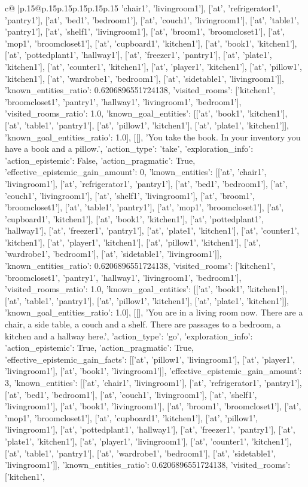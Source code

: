 \documentclass{article}
\begin{document}
{\begin{supertabular}{c@{$\;$}|p{.15\linewidth}@{}p{.15\linewidth}p{.15\linewidth}p{.15\linewidth}p{.15\linewidth}p{.15\linewidth}}
{{{'chair1', 'livingroom1'], ['at', 'refrigerator1', 'pantry1'], ['at', 'bed1', 'bedroom1'], ['at', 'couch1', 'livingroom1'], ['at', 'table1', 'pantry1'], ['at', 'shelf1', 'livingroom1'], ['at', 'broom1', 'broomcloset1'], ['at', 'mop1', 'broomcloset1'], ['at', 'cupboard1', 'kitchen1'], ['at', 'book1', 'kitchen1'], ['at', 'pottedplant1', 'hallway1'], ['at', 'freezer1', 'pantry1'], ['at', 'plate1', 'kitchen1'], ['at', 'counter1', 'kitchen1'], ['at', 'player1', 'kitchen1'], ['at', 'pillow1', 'kitchen1'], ['at', 'wardrobe1', 'bedroom1'], ['at', 'sidetable1', 'livingroom1']], 'known_entities_ratio': 0.6206896551724138, 'visited_rooms': ['kitchen1', 'broomcloset1', 'pantry1', 'hallway1', 'livingroom1', 'bedroom1'], 'visited_rooms_ratio': 1.0, 'known_goal_entities': [['at', 'book1', 'kitchen1'], ['at', 'table1', 'pantry1'], ['at', 'pillow1', 'kitchen1'], ['at', 'plate1', 'kitchen1']], 'known_goal_entities_ratio': 1.0}}], [[], 'You take the book. In your inventory you have a book and a pillow.', {'action_type': 'take', 'exploration_info': {'action_epistemic': False, 'action_pragmatic': True, 'effective_epistemic_gain_amount': 0, 'known_entities': [['at', 'chair1', 'livingroom1'], ['at', 'refrigerator1', 'pantry1'], ['at', 'bed1', 'bedroom1'], ['at', 'couch1', 'livingroom1'], ['at', 'shelf1', 'livingroom1'], ['at', 'broom1', 'broomcloset1'], ['at', 'table1', 'pantry1'], ['at', 'mop1', 'broomcloset1'], ['at', 'cupboard1', 'kitchen1'], ['at', 'book1', 'kitchen1'], ['at', 'pottedplant1', 'hallway1'], ['at', 'freezer1', 'pantry1'], ['at', 'plate1', 'kitchen1'], ['at', 'counter1', 'kitchen1'], ['at', 'player1', 'kitchen1'], ['at', 'pillow1', 'kitchen1'], ['at', 'wardrobe1', 'bedroom1'], ['at', 'sidetable1', 'livingroom1']], 'known_entities_ratio': 0.6206896551724138, 'visited_rooms': ['kitchen1', 'broomcloset1', 'pantry1', 'hallway1', 'livingroom1', 'bedroom1'], 'visited_rooms_ratio': 1.0, 'known_goal_entities': [['at', 'book1', 'kitchen1'], ['at', 'table1', 'pantry1'], ['at', 'pillow1', 'kitchen1'], ['at', 'plate1', 'kitchen1']], 'known_goal_entities_ratio': 1.0}}], [[], 'You are in a living room now. There are a chair, a side table, a couch and a shelf. There are passages to a bedroom, a kitchen and a hallway here.', {'action_type': 'go', 'exploration_info': {'action_epistemic': True, 'action_pragmatic': True, 'effective_epistemic_gain_facts': [['at', 'pillow1', 'livingroom1'], ['at', 'player1', 'livingroom1'], ['at', 'book1', 'livingroom1']], 'effective_epistemic_gain_amount': 3, 'known_entities': [['at', 'chair1', 'livingroom1'], ['at', 'refrigerator1', 'pantry1'], ['at', 'bed1', 'bedroom1'], ['at', 'couch1', 'livingroom1'], ['at', 'shelf1', 'livingroom1'], ['at', 'book1', 'livingroom1'], ['at', 'broom1', 'broomcloset1'], ['at', 'mop1', 'broomcloset1'], ['at', 'cupboard1', 'kitchen1'], ['at', 'pillow1', 'livingroom1'], ['at', 'pottedplant1', 'hallway1'], ['at', 'freezer1', 'pantry1'], ['at', 'plate1', 'kitchen1'], ['at', 'player1', 'livingroom1'], ['at', 'counter1', 'kitchen1'], ['at', 'table1', 'pantry1'], ['at', 'wardrobe1', 'bedroom1'], ['at', 'sidetable1', 'livingroom1']], 'known_entities_ratio': 0.6206896551724138, 'visited_rooms': ['kitchen1', }}}
\end{supertabular}}
\end{document}
